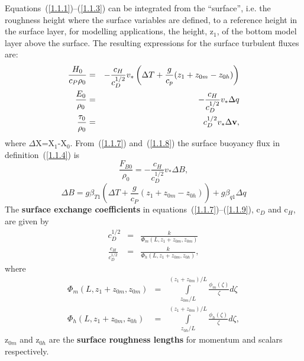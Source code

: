 \documentclass{UMDP_article}
\begin{document}
Equations~(\ref{1.1.1})--(\ref{1.1.3}) can be integrated from the
``surface'', i.e. the roughness height where the surface variables are
defined, to a reference height in the surface layer, for modelling
applications, the height, z$_{1}$, of the bottom model layer above the
surface. The resulting expressions for the surface turbulent fluxes
are:
\begin{eqnarray}
  \frac{ H_0 }{ c_P  \rho _0 }&=&-\frac{ c_H }{ c_D^{1/2} }  v_\ast \left( {\Delta T + \frac{g}{c_p }( z_1 +  z_{0m} -  z_{0h} )} \right)\label{1.1.7}\\
  \frac{ E_0 }{ \rho _0 }&=&-\frac{ c_H }{ c_D^{1/2} }  v_\ast \Delta q\label{1.1.8}\\
  \frac{ {\bf \tau }_{0} }{ \rho _{0} }&=& c_D^{1/2}  v_\ast \Delta {\rm {\bf v}},\label{1.1.9}
\end{eqnarray}
where $\Delta $X=X$_{1}$-X$_{0}$. From~(\ref{1.1.7}) and~(\ref{1.1.8})
the surface buoyancy flux in definition~(\ref{1.1.4}) is
\begin{equation}
  \frac{ F_{B0} }{ \rho _0 } = -\frac{ c_H }{ c_D^{1/2} }  v_\ast \Delta B,
  \label{1.1.10}
\end{equation}
\begin{equation}
  \Delta B =  g \beta _{T1} \left( {\Delta T + \frac{g}{ c_P }( z_1 + z_{0m} -  z_{0h} )} \right) 
  +  g \beta _{q1} \Delta q
  \label{1.1.11}
\end{equation}
The \textbf{surface exchange coefficients }in
equations~(\ref{1.1.7})--(\ref{1.1.9}), c$_{D}$ and c$_{H}$, are given
by
\begin{eqnarray}
  c_D^{1/2}&=&\frac{k}{ \Phi _m (L ,  z_1 +  z_{0m} ,  z_{0m} )}
  \label{1.1.12}\\
  \frac{ c_H }{ c_D^{1/2} }&=&\frac{k}{ \Phi _h (L ,  z_1 +  z_{0m} ,  z_{0h} )},
  \label{1.1.13}
\end{eqnarray}
where
\begin{eqnarray}
  \Phi _m (L ,  z_1 +  z_{0m} ,  z_{0m} )&=& \int \limits_{ z_{0m} /L}^{( z_1 + z_{0m} )/L} \frac{ \phi _m (\zeta )}{\zeta } d\zeta\label{1.1.14}\\
  \Phi _h (L ,  z_1 +  z_{0m} ,  z_{0h} )&=& \int \limits_{ z_{0h} /L}^{( z_1 + z_{0m} )/L} \frac{ \phi _h (\zeta )}{\zeta } d\zeta\label{1.1.15},
\end{eqnarray}
z$_{0m}$ and z$_{0h}$ are the \textbf{surface roughness lengths }for
momentum and scalars respectively.
\end{document}
